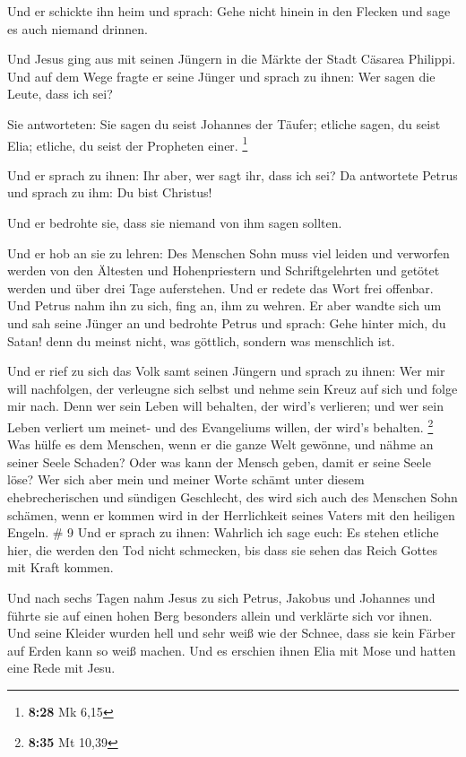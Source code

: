  Und er schickte ihn heim und sprach: Gehe nicht hinein
in den Flecken und sage es auch niemand drinnen.

 Und Jesus ging aus mit seinen Jüngern in die Märkte der
Stadt Cäsarea Philippi. Und auf dem Wege fragte er seine Jünger und
sprach zu ihnen: Wer sagen die Leute, dass ich sei?

 Sie antworteten: Sie sagen du seist Johannes der Täufer;
etliche sagen, du seist Elia; etliche, du seist der Propheten einer.
\footnote{\textbf{8:28} Mk 6,15}

 Und er sprach zu ihnen: Ihr aber, wer sagt ihr, dass ich
sei? Da antwortete Petrus und sprach zu ihm: Du bist Christus!

 Und er bedrohte sie, dass sie niemand von ihm sagen
sollten.

 Und er hob an sie zu lehren: Des Menschen Sohn muss viel
leiden und verworfen werden von den Ältesten und Hohenpriestern und
Schriftgelehrten und getötet werden und über drei Tage auferstehen.
 Und er redete das Wort frei offenbar. Und Petrus nahm
ihn zu sich, fing an, ihm zu wehren.  Er aber wandte sich
um und sah seine Jünger an und bedrohte Petrus und sprach: Gehe hinter
mich, du Satan! denn du meinst nicht, was göttlich, sondern was
menschlich ist.

 Und er rief zu sich das Volk samt seinen Jüngern und
sprach zu ihnen: Wer mir will nachfolgen, der verleugne sich selbst und
nehme sein Kreuz auf sich und folge mir nach.  Denn wer
sein Leben will behalten, der wird's verlieren; und wer sein Leben
verliert um meinet- und des Evangeliums willen, der wird's behalten.
\footnote{\textbf{8:35} Mt 10,39}  Was hülfe es dem
Menschen, wenn er die ganze Welt gewönne, und nähme an seiner Seele
Schaden?  Oder was kann der Mensch geben, damit er seine
Seele löse?  Wer sich aber mein und meiner Worte schämt
unter diesem ehebrecherischen und sündigen Geschlecht, des wird sich
auch des Menschen Sohn schämen, wenn er kommen wird in der Herrlichkeit
seines Vaters mit den heiligen Engeln. \# 9  Und er sprach
zu ihnen: Wahrlich ich sage euch: Es stehen etliche hier, die werden den
Tod nicht schmecken, bis dass sie sehen das Reich Gottes mit Kraft
kommen.

 Und nach sechs Tagen nahm Jesus zu sich Petrus, Jakobus
und Johannes und führte sie auf einen hohen Berg besonders allein und
verklärte sich vor ihnen.  Und seine Kleider wurden hell
und sehr weiß wie der Schnee, dass sie kein Färber auf Erden kann so
weiß machen.  Und es erschien ihnen Elia mit Mose und
hatten eine Rede mit Jesu.

